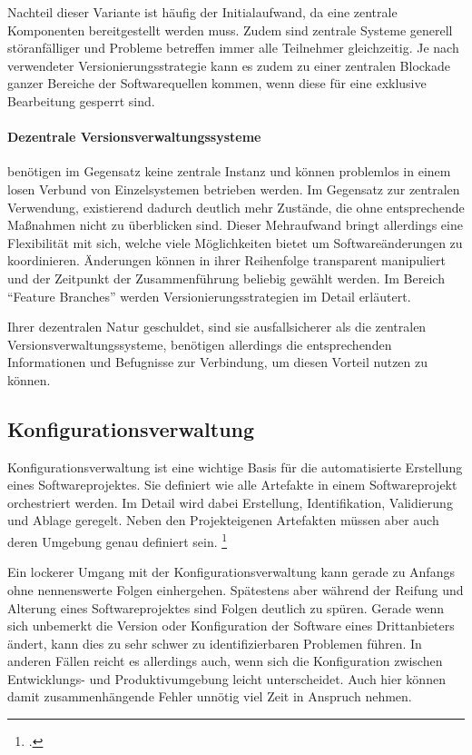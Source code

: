 Nachteil dieser Variante ist häufig der Initialaufwand, da eine zentrale Komponenten bereitgestellt werden muss. Zudem sind zentrale Systeme generell störanfälliger und Probleme betreffen immer alle Teilnehmer gleichzeitig.
Je nach verwendeter Versionierungsstrategie kann es zudem zu einer zentralen Blockade ganzer Bereiche der Softwarequellen kommen, wenn diese für eine exklusive Bearbeitung gesperrt sind.

\paragraph{Dezentrale Versionsverwaltungssysteme} benötigen im Gegensatz keine zentrale Instanz und können problemlos in einem losen Verbund von Einzelsystemen betrieben werden. 
Im Gegensatz zur zentralen Verwendung, existierend dadurch deutlich mehr Zustände, die ohne entsprechende Maßnahmen nicht zu überblicken sind. Dieser Mehraufwand bringt allerdings eine Flexibilität mit sich, welche viele Möglichkeiten bietet um Softwareänderungen zu koordinieren. Änderungen können in ihrer Reihenfolge transparent manipuliert und der Zeitpunkt der Zusammenführung beliebig gewählt werden. 
Im Bereich ``Feature Branches'' werden Versionierungsstrategien im Detail erläutert.

Ihrer dezentralen Natur geschuldet, sind sie ausfallsicherer als die zentralen Versionsverwaltungssysteme, benötigen allerdings die entsprechenden Informationen und Befugnisse zur Verbindung, um diesen Vorteil nutzen zu können.

\subsection{Konfigurationsverwaltung}
\label{subsec:konfigurationsverwaltung}

Konfigurationsverwaltung ist eine wichtige Basis für die automatisierte Erstellung eines Softwareprojektes. Sie definiert wie alle Artefakte in einem Softwareprojekt orchestriert werden. Im Detail wird dabei Erstellung, Identifikation, Validierung und Ablage geregelt. Neben den Projekteigenen Artefakten müssen aber auch deren Umgebung genau definiert sein. \footcite{humble2010}

Ein lockerer Umgang mit der Konfigurationsverwaltung kann gerade zu Anfangs ohne nennenswerte Folgen einhergehen. Spätestens aber während der Reifung und Alterung eines Softwareprojektes sind Folgen deutlich zu spüren. Gerade wenn sich unbemerkt die Version oder Konfiguration der Software eines Drittanbieters ändert, kann dies zu sehr schwer zu identifizierbaren Problemen führen. In anderen Fällen reicht es allerdings auch, wenn sich die Konfiguration zwischen Entwicklungs- und Produktivumgebung leicht unterscheidet. Auch hier können damit zusammenhängende Fehler unnötig viel Zeit in Anspruch nehmen.

